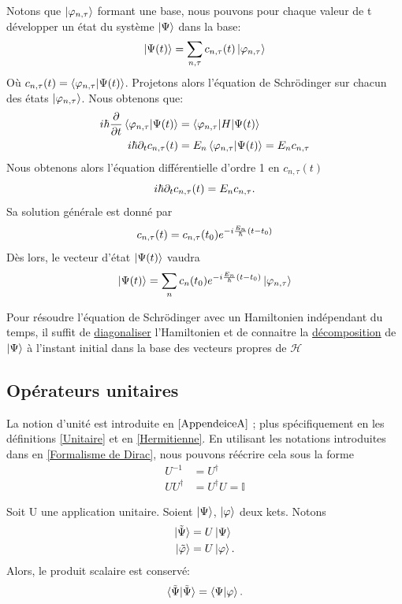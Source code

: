 \documentclass[../notesdecours.tex]{subfiles}
\begin{document}
Notons que $\ket{\varphi_{n,\tau}}$ formant une base, nous pouvons pour chaque valeur de t développer un état du système $\ket{\Psi}$ dans la base:
\begin{equation}
\ket{\Psi (t)} = \sum_{n,\tau} c_{n,\tau} (t)\ket{\varphi_{n,\tau}}
\end{equation}
Où $c_{n,\tau}(t) = \braket{\varphi_{n,\tau}|\Psi (t)}$. Projetons alors l'équation de Schrödinger sur chacun des états $\ket{\varphi_{n,\tau}}$. Nous obtenons que:
\begin{align*}
i\hbar\frac{\partial}{\partial t}\braket{\varphi_{n,\tau}|\Psi (t)} &= \braket{\varphi_{n,\tau} | H | \Psi (t)}\\
i\hbar\partial_tc_{n,\tau}(t) &= E_n \braket{\varphi_{n,\tau}|\Psi(t)} = E_nc_{n,\tau}
\end{align*}
Nous obtenons alors l'équation différentielle d'ordre 1 en $c_{n,\tau} (t)$
\begin{equation}
i\hbar\partial_tc_{n,\tau}(t) = E_nc_{n,\tau}.
\end{equation}
Sa solution générale est donné par 
\begin{equation}
c_{n,\tau} (t) = c_{n,\tau} (t_0) e^{-i \frac{E_n}{\hbar} (t-t_0)}
\end{equation}
Dès lors, le vecteur d'état $\ket{\Psi(t)}$ vaudra
\begin{equation}
\ket{\Psi(t)} = \sum_n c_n(t_0)e^{-i\frac{E_n}{\hbar}(t-t_0)} \ket{\varphi_{n,\tau}}
\end{equation}

Pour résoudre l'équation de Schrödinger avec un Hamiltonien indépendant du temps, il suffit de \underline{diagonaliser} l'Hamiltonien et de connaitre la \underline{décomposition} de $\ket{\Psi}$ à l'instant initial dans la base des vecteurs propres de $\mathcal{H}$

\subsection{Opérateurs unitaires}
La notion d'unité est introduite en $\ref{AppendeiceA}$ ; plus spécifiquement en les définitions \ref{Unitaire} et en \ref{Hermitienne}. En utilisant les notations introduites dans en \ref{Formalisme de Dirac}, nous pouvons réécrire cela sous la forme
\begin{align}
U^{-1} &= U^\dag\\
UU^\dag &= U^\dag U = \mathbb{I}
\end{align}
\begin{Property} Soit U une application unitaire. Soient $\ket{\Psi}$, $\ket{\varphi}$ deux kets. Notons
\begin{align*}
\ket{\tilde{\Psi}} &= U\ket{\Psi}\\
\ket{\tilde{\varphi}} &= U\ket{\varphi}.
\end{align*}
Alors, le produit scalaire est conservé:
\begin{equation}
\braket{\tilde{\Psi}|\tilde{\Psi}} = \braket{\Psi|\varphi}.
\end{equation}
\end{Property}
\end{document}
